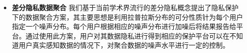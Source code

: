 	\begin{itemize}
		\item {\bfseries 差分隐私数据聚合} 
		我们基于当前学术界流行的差分隐私概念提出了隐私保护下的数据聚合方案，其主要思想是利用拉普拉斯分布的可分性质针为每个用户指定一个噪声分布。每个用户根据相应的噪声分布进行加噪后将结果报告给平台。通过使用此方案，用户对其数据隐私进行得到相应的保护平台可以在不知道用户真实感知数据的情况下，对聚合数据的噪声水平进行一定的控制。
		
		
		

\end{itemize}
